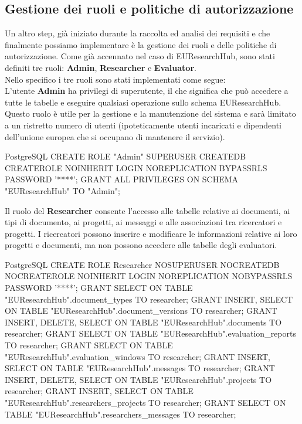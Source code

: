 \documentclass{report}
\begin{document}
\subsection{Gestione dei ruoli e politiche di autorizzazione}
Un altro step, già iniziato durante la raccolta ed analisi dei requisiti e che finalmente possiamo implementare è la gestione dei ruoli e delle politiche di autorizzazione. Come già accennato nel caso di EUResearchHub, sono stati definiti tre ruoli: \textbf{Admin}, \textbf{Researcher} e \textbf{Evaluator}. \\
Nello specifico i tre ruoli sono stati implementati come segue:\\
L'utente \textbf{Admin} ha privilegi di superutente, il che significa che può accedere a tutte le tabelle e eseguire qualsiasi operazione sullo schema EUResearchHub. Questo ruolo è utile per la gestione e la manutenzione del sistema e sarà  limitato a un ristretto numero di utenti (ipoteticamente utenti incaricati e dipendenti dell'unione europea che si occupano di mantenere il servizio).
\begin{imtaCode}{PostgreSQL}
CREATE ROLE "Admin" SUPERUSER CREATEDB CREATEROLE NOINHERIT LOGIN NOREPLICATION BYPASSRLS PASSWORD '****';
GRANT ALL PRIVILEGES ON SCHEMA "EUResearchHub" TO "Admin";
\end{imtaCode}
Il ruolo del \textbf{Researcher} consente l'accesso alle tabelle relative ai documenti, ai tipi di documento, ai progetti, ai messaggi e alle associazioni tra ricercatori e progetti. I ricercatori possono inserire e modificare le informazioni relative ai loro progetti e documenti, ma non possono accedere alle tabelle degli evaluatori.
\begin{imtaCode}{PostgreSQL}
CREATE ROLE Researcher NOSUPERUSER NOCREATEDB NOCREATEROLE NOINHERIT LOGIN NOREPLICATION NOBYPASSRLS PASSWORD '****';
GRANT SELECT ON TABLE "EUResearchHub".document_types TO researcher;
GRANT INSERT, SELECT ON TABLE "EUResearchHub".document_versions TO researcher;
GRANT INSERT, DELETE, SELECT ON TABLE "EUResearchHub".documents TO researcher;
GRANT SELECT ON TABLE "EUResearchHub".evaluation_reports TO researcher;
GRANT SELECT ON TABLE "EUResearchHub".evaluation_windows TO researcher;
GRANT INSERT, SELECT ON TABLE "EUResearchHub".messages TO researcher;
GRANT INSERT, DELETE, SELECT ON TABLE "EUResearchHub".projects TO researcher;
GRANT INSERT, SELECT ON TABLE "EUResearchHub".researchers_projects TO researcher;
GRANT SELECT ON TABLE "EUResearchHub".researchers_messages TO researcher;
\end{imtaCode}
\end{document}
